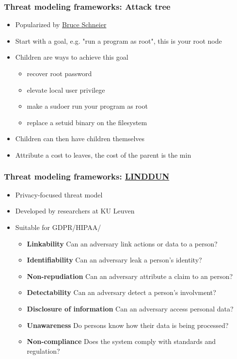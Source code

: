 \begin{frame}
  \frametitle{Threat modeling frameworks: Attack tree}
  \begin{itemize}
    \item Popularized by \href{https://www.schneier.com/academic/archives/1999/12/attack_trees.html}{Bruce Schneier}
    \item Start with a goal, e.g. "run a program as root", this is your root node
    \item Children are ways to achieve this goal
    \begin{itemize}
      \item recover root password
      \item elevate local user privilege
      \item make a sudoer run your program as root
      \item replace a setuid binary on the filesystem
    \end{itemize}
    \item Children can then have children themselves
    \item Attribute a cost to leaves, the cost of the parent is the min
  \end{itemize}
\end{frame}

\begin{frame}
  \frametitle{Threat modeling frameworks: \href{https://linddun.org/}{LINDDUN}}
  \begin{itemize}
    \item Privacy-focused threat model
    \item Developed by researchers at KU Leuven
    \item Suitable for GDPR/HIPAA/
    \begin{itemize}
      \item \textbf{Linkability} Can an adversary link actions or data to a person?
      \item \textbf{Identifiability} Can an adversary leak a person's identity?
      \item \textbf{Non-repudiation} Can an adversary attribute a claim to an person?
      \item \textbf{Detectability} Can an adversary detect a person's involvment?
      \item \textbf{Disclosure of information} Can an adversary access personal data?
      \item \textbf{Unawareness} Do persons know how their data is being processed?
      \item \textbf{Non-compliance} Does the system comply with standards and regulation?
    \end{itemize}
  \end{itemize}
\end{frame}

